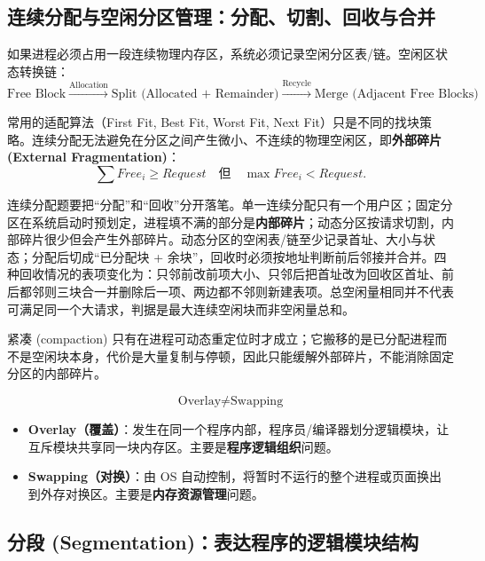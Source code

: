 \documentclass[11pt,a4paper]{ctexart}
\newcommand{\kw}[1]{\textbf{#1}}
\begin{document}
\subsection{连续分配与空闲分区管理：分配、切割、回收与合并}

如果进程必须占用一段连续物理内存区，系统必须记录空闲分区表/链。空闲区状态转换链：
\[
\boxed{
\text{Free Block}
\xrightarrow{\text{Allocation}}
\text{Split (Allocated + Remainder)}
\xrightarrow{\text{Recycle}}
\text{Merge (Adjacent Free Blocks)}
}
\]

常用的适配算法（First Fit, Best Fit, Worst Fit, Next Fit）只是不同的找块策略。连续分配无法避免在分区之间产生微小、不连续的物理空闲区，即\kw{外部碎片 (External Fragmentation)}：
\[
\sum Free_i \ge Request \quad\text{但}\quad \max Free_i < Request.
\]

\begin{method}[连续分区的完整状态机]
连续分配题要把“分配”和“回收”分开落笔。单一连续分配只有一个用户区；固定分区在系统启动时预划定，进程填不满的部分是\kw{内部碎片}；动态分区按请求切割，内部碎片很少但会产生外部碎片。动态分区的空闲表/链至少记录首址、大小与状态；分配后切成“已分配块 + 余块”，回收时必须按地址判断前后邻接并合并。四种回收情况的表项变化为：只邻前改前项大小、只邻后把首址改为回收区首址、前后都邻则三块合一并删除后一项、两边都不邻则新建表项。总空闲量相同并不代表可满足同一个大请求，判据是最大连续空闲块而非空闲量总和。
\end{method}

紧凑 (compaction) 只有在进程可动态重定位时才成立；它搬移的是已分配进程而不是空闲块本身，代价是大量复制与停顿，因此只能缓解外部碎片，不能消除固定分区的内部碎片。

\begin{method}
\[
\boxed{\text{Overlay} \neq \text{Swapping}}
\]
\begin{itemize}
  \item \kw{Overlay（覆盖）}：发生在同一个程序内部，程序员/编译器划分逻辑模块，让互斥模块共享同一块内存区。主要是\kw{程序逻辑组织}问题。
  \item \kw{Swapping（对换）}：由 OS 自动控制，将暂时不运行的整个进程或页面换出到外存对换区。主要是\kw{内存资源管理}问题。
\end{itemize}
\end{method}

\subsection{分段 (Segmentation)：表达程序的逻辑模块结构}
\end{document}
